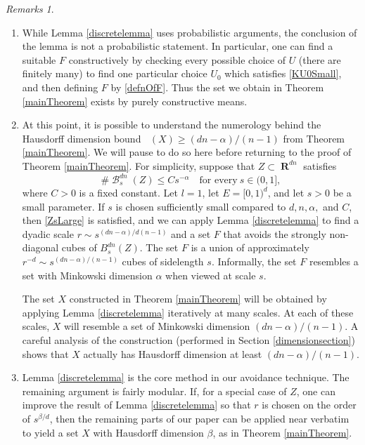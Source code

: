 \documentclass[dvipsnames,letterpaper,12pt]{article}
\numberwithin{equation}{section}
\theoremstyle{plain}
\theoremstyle{remark}
\newtheorem*{remarks}{Remarks}
\DeclareMathOperator{\hausdim}{\dim_{\mathbf{H}}}
\DeclareMathOperator{\RR}{\mathbf{R}}
\DeclareMathOperator{\B}{\mathcal{B}}
\begin{document}
\begin{remarks}
	\
	\begin{enumerate}[1.]
		\item While Lemma \ref{discretelemma} uses probabilistic arguments, the conclusion of the lemma is not a probabilistic statement. In particular, one can find a suitable $F$ constructively by checking every possible choice of $U$ (there are finitely many) to find one particular choice $U_0$ which satisfies \eqref{KU0Small}, and then defining $F$ by \eqref{defnOfF}. Thus the set we obtain in Theorem \ref{mainTheorem} exists by purely constructive means.
		
		\item At this point, it is possible to understand the numerology behind the Hausdorff dimension bound $\hausdim(X) \geq (dn-\alpha)/(n-1)$ from Theorem \ref{mainTheorem}. We will pause to do so here before returning to the proof of Theorem \ref{mainTheorem}. For simplicity, suppose that $Z \subset \RR^{dn}$ satisfies 
		\begin{equation}\label{specialCase}
			\#\B_{s}^{dn}(Z)\leq C s^{-\alpha}\quad  \textrm{for every}\ s\in(0,1],
		\end{equation}
		where $C > 0$ is a fixed constant. Let $l=1$, let $E=[0,1)^d$, and let $s>0$ be a small parameter. If $s$ is chosen sufficiently small compared to $d,n,\alpha,$ and $C$, then \eqref{ZsLarge} is satisfied, and we can apply Lemma \ref{discretelemma} to find a dyadic scale $r \sim s^{(dn-\alpha)/d(n-1)}$ and a set $F$ that avoids the strongly non-diagonal cubes of $B_{s}^{dn}(Z)$. The set $F$ is a union of approximately $r^{-d} \sim s^{(dn-\alpha)/(n-1)}$ cubes of sidelength $s$. Informally, the set $F$ resembles a set with Minkowski dimension $\alpha$ when viewed at scale $s$. 

		The set $X$ constructed in Theorem \ref{mainTheorem} will be obtained by applying Lemma \ref{discretelemma} iteratively at many scales. At each of these scales, $X$ will resemble a set of Minkowski dimension $(dn - \alpha)/(n-1)$. A careful analysis of the construction (performed in Section \ref{dimensionsection}) shows that $X$ actually has Hausdorff dimension at least $(dn - \alpha)/(n-1)$.

		\item Lemma \ref{discretelemma} is the core method in our avoidance technique. The remaining argument is fairly modular. If, for a special case of $Z$, one can improve the result of Lemma \ref{discretelemma} so that $r$ is chosen on the order of $s^{\beta/d}$, then the remaining parts of our paper can be applied near verbatim to yield a set $X$ with Hausdorff dimension $\beta$, as in Theorem \ref{mainTheorem}. 
	\end{enumerate} 
\end{remarks}
\end{document}
